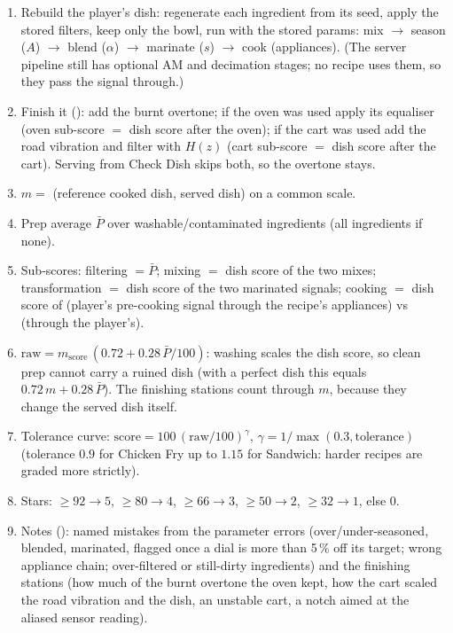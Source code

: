 \documentclass[11pt,a4paper]{article}
\begin{document}
\begin{enumerate}
\item Rebuild the player's dish: regenerate each ingredient from its seed, apply the stored
  filters, keep only the bowl, run  with the stored params:
  mix $\rightarrow$ season ($A$) $\rightarrow$ blend ($\alpha$) $\rightarrow$ marinate ($s$) $\rightarrow$
  cook (appliances). (The server pipeline still has optional AM and decimation stages; no recipe
  uses them, so they pass the signal through.)
\item Finish it (): add the burnt overtone; if the oven was used apply its
  equaliser (oven sub-score $=$ dish score after the oven); if the cart was used add the road
  vibration and filter with $H(z)$ (cart sub-score $=$ dish score after the cart). Serving
  from Check Dish skips both, so the overtone stays.
\item $m=$ (reference cooked dish, served dish) on a common scale.
\item Prep average $\bar P$ over washable/contaminated ingredients (all ingredients if none).
\item Sub-scores: filtering $=\bar P$; mixing $=$ dish score of the two mixes; transformation
  $=$ dish score of the two marinated signals; cooking $=$ dish score of
  (player's pre-cooking signal through the recipe's appliances) vs (through the player's).
\item $\text{raw}=m_{\text{score}}\,(0.72+0.28\,\bar P/100)$: washing scales the dish score, so clean
  prep cannot carry a ruined dish (with a perfect dish this equals $0.72\,m+0.28\,\bar P$). The
  finishing stations count through $m$, because they change the served dish itself.
\item Tolerance curve: $\text{score}=100\,(\text{raw}/100)^{\gamma}$,
  $\gamma=1/\max(0.3,\text{tolerance})$ (tolerance $0.9$ for Chicken Fry up to $1.15$ for Sandwich:
  harder recipes are graded more strictly).
\item Stars: $\ge92\to5$, $\ge80\to4$, $\ge66\to3$, $\ge50\to2$, $\ge32\to1$, else 0.
\item Notes (): named mistakes from the parameter errors (over/under-seasoned,
  blended, marinated, flagged once a dial is more than 5\,\% off its target; wrong appliance
  chain; over-filtered or still-dirty ingredients) and the finishing stations (how much of the
  burnt overtone the oven kept, how the cart scaled the road vibration and the dish, an unstable
  cart, a notch aimed at the aliased sensor reading).
\end{enumerate}
\end{document}
